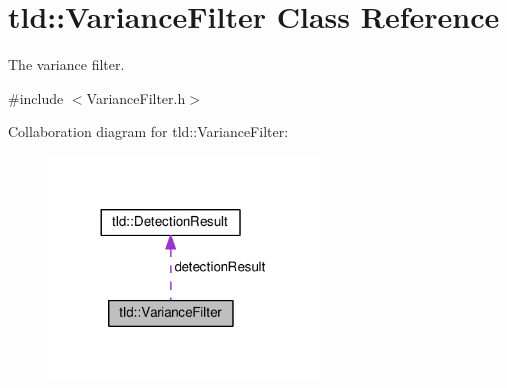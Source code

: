 \hypertarget{classtld_1_1VarianceFilter}{\section{tld\-:\-:Variance\-Filter Class Reference}
\label{classtld_1_1VarianceFilter}
}


The variance filter.  




{\ttfamily \#include $<$Variance\-Filter.\-h$>$}



Collaboration diagram for tld\-:\-:Variance\-Filter\-:\nopagebreak
\begin{figure}[H]
\begin{center}
\leavevmode
\includegraphics[width=204pt]{classtld_1_1VarianceFilter__coll__graph}
\end{center}
\end{figure}
